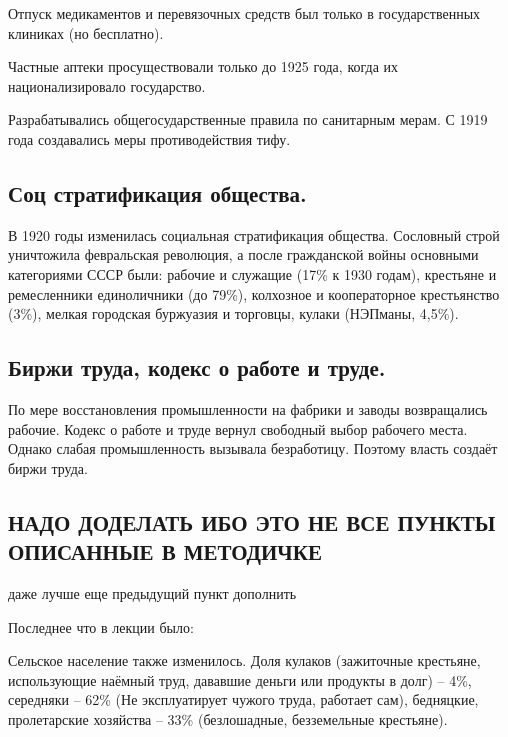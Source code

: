  Отпуск медикаментов и перевязочных средств был только в государственных клиниках (но бесплатно). 
 
 Частные аптеки просуществовали только до 1925 года, когда их национализировало государство. 
 
 Разрабатывались общегосударственные правила по санитарным мерам. С 1919 года создавались меры противодействия тифу.

 \subsection{Соц стратификация общества.}

 В 1920 годы изменилась социальная стратификация общества. Сословный строй уничтожила февральская революция, а после гражданской войны основными категориями СССР были: рабочие и служащие (17\% к 1930 годам), крестьяне и ремесленники единоличники (до 79\%), колхозное и кооператорное крестьянство (3\%), мелкая городская буржуазия и торговцы, кулаки (НЭПманы, 4,5\%).

 \subsection{Биржи труда, кодекс о работе и труде.}

 По мере восстановления промышленности на фабрики и заводы возвращались рабочие. Кодекс о работе и труде вернул свободный выбор рабочего места. Однако слабая промышленность вызывала безработицу. Поэтому власть создаёт биржи труда. 

 \subsection{НАДО ДОДЕЛАТЬ ИБО ЭТО НЕ ВСЕ ПУНКТЫ ОПИСАННЫЕ В МЕТОДИЧКЕ}

 даже лучше еще предыдущий пункт дополнить 

 Последнее что в лекции было:

 Сельское население также изменилось. Доля кулаков (зажиточные крестьяне, использующие наёмный труд, дававшие деньги или продукты в долг) – 4\%, середняки – 62\% (Не эксплуатирует чужого труда, работает сам), бедняцкие, пролетарские хозяйства – 33\% (безлошадные, безземельные крестьяне).